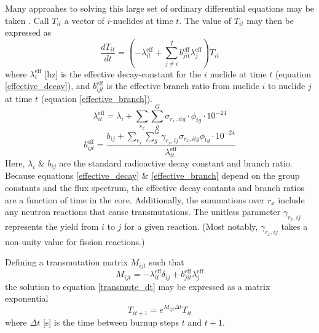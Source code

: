 Many approahes to solving this large set of ordinary differential equations may be taken \cite{Isotalo2011}.  
Call $T_{it}$ a vector of $i$-nuclides at time $t$.  The value of $T_{it}$ may then be expressed as 
\begin{equation}
\label{transmute_dt}
\frac{dT_{it}}{dt} = \left(-\lambda_{it}^{\mbox{eff}} + \sum_{j \ne i}^I  b_{jit}^{\mbox{eff}} \lambda_j^{\mbox{eff}}\right) T_{it}
\end{equation}
where $\lambda_i^{\mbox{eff}}$ [hz] is the effective decay-constant for the $i$ nuclide at time $t$ (equation \ref{effective_decay}), 
and $b_{ijt}^{\mbox{eff}}$ is the effective branch ratio from nuclide $i$ to nuclide $j$ at time $t$ (equation \ref{effective_branch}). 
\begin{equation}
\label{effective_decay}
\lambda_{it}^{\mbox{eff}} = \lambda_i + \sum_{r_x} \sum_g^G \sigma_{r_x,itg} \cdot \phi_{tg} \cdot 10^{-24}
\end{equation}
\begin{equation}
\label{effective_branch}
b_{ijt}^{\mbox{eff}} = \frac{b_{ij} + \sum_{r_x} \sum_g^G \gamma_{r_x,ij} \sigma_{r_x,itg} \phi_{tg} \cdot 10^{-24}}
                            {\lambda_{it}^{\mbox{eff}}}
\end{equation}
Here, $\lambda_i$ \& $b_{ij}$ are the standard radioactive decay constant and branch ratio.  Because equations
\ref{effective_decay} \& \ref{effective_branch} depend on the group constants and the flux spectrum, the 
effective decay contants and branch ratios are a function of time in the core.  Additionally, the summations
over $r_x$ include any neutron reactions that cause transmutations.  The unitless parameter $\gamma_{r_x,ij}$
represents the yield from $i$ to $j$ for a given reaction.  (Most notably, $\gamma_{r_x,ij}$ takes a non-unity
value for fission reactions.)

Defining a transmutation matrix $M_{ijt}$ such that
\begin{equation}
\label{transmute_M}
M_{ijt} = -\lambda_{it}^{\mbox{eff}}\delta_{ij} + b_{jit}^{\mbox{eff}} \lambda_j^{\mbox{eff}}
\end{equation}
the solution to equation \ref{transmute_dt} may be expressed as a matrix exponential
\begin{equation}
\label{transmute_sol}
T_{it+1} = e^{M_{ijt}\Delta t} T_{it}
\end{equation}
where $\Delta t$ [s] is the time between burnup steps $t$ and $t+1$.

